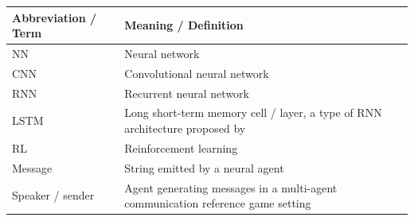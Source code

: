 
\begin{table}[]
	\centering
	\begin{tabularx}{\textwidth}{|X|X|}
		\hline
		\textbf{Abbreviation / Term} & \textbf{Meaning / Definition}                                                                                                                          \\ \hline
		NN                           & Neural network                                                                                                                                         \\ \hline
		CNN                          & Convolutional neural network                                                                                                                           \\ \hline
		RNN                          & Recurrent neural network                                                                                                                               \\ \hline
		LSTM                         & Long short-term memory cell / layer, a type of RNN architecture proposed by \cite{hochreiter1997long}                                                                                                                         \\ \hline
		RL                           & Reinforcement learning                                                                                                                                 \\ \hline
		Message                      & String emitted by a neural agent                                                                                                                       \\ \hline
		Speaker / sender             & Agent generating messages in a multi-agent communication reference game setting                                                                        \\ \hline

\end{tabularx}
\end{table}
